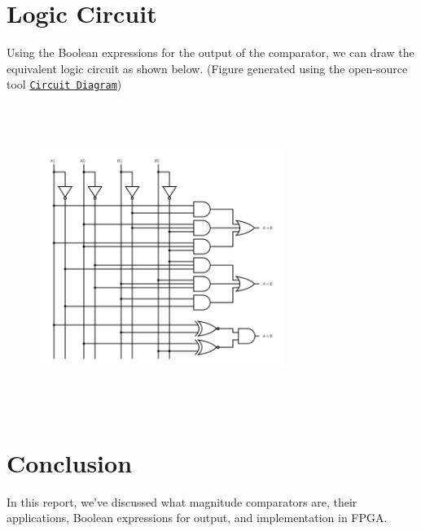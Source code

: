 \documentclass[journal,12pt,twocolumn]{IEEEtran}
\numberwithin{equation}{section}
\begin{document}
 \section{Logic Circuit}
 Using the Boolean expressions for the output of the comparator, we can draw the equivalent logic circuit as shown below. (Figure generated using the open-source tool \href{https://github.com/circuitdiagram}{\texttt{Circuit Diagram}})
\begin{figure}[H]
\centering
\includegraphics[height=10cm, width = 8cm]{circuit.png}
\end{figure}
  
  
 \section{Conclusion}
 
 
 In this report, we've discussed what magnitude comparators are, their applications, Boolean expressions for output, and implementation in FPGA.
  
\end{document}
